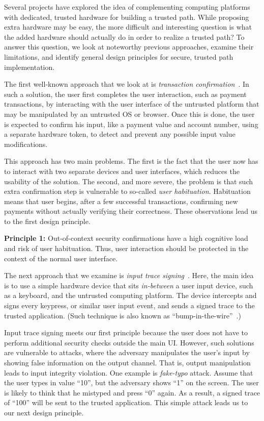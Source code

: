 Several projects have explored the idea of complementing computing platforms with dedicated, trusted hardware for building a trusted path. While proposing extra hardware may be easy, the more difficult and interesting question is what the added hardware should actually do in order to realize a trusted path? To answer this question, we look at noteworthy previous approaches, examine their limitations, and identify general design principles for secure, trusted path implementation.
    
The first well-known approach that we look at is \emph{transaction confirmation}~\cite{filyanov2011uni}. In such a solution, the user first completes the user interaction, such as payment transactions, by interacting with the user interface of the untrusted platform that may be manipulated by an untrusted OS or browser. Once this is done, the user is expected to confirm his input, like a payment value and account number, using a separate hardware token, to detect and prevent any possible input value modifications.

This approach has two main problems. The first is the fact that the user now has to interact with two separate devices and user interfaces, which reduces the usability of the solution. The second, and more severe, the problem is that such extra confirmation step is vulnerable to so-called \emph{user habituation}. Habituation means that user begins, after a few successful transactions, confirming new payments without actually verifying their correctness. These observations lead us to the first design principle.  

\begin{tcolorbox}
\textbf{Principle 1:} Out-of-context security confirmations have a high cognitive load and risk of user habituation. Thus, user interaction should be protected in the context of the normal user interface.
\end{tcolorbox}

The next approach that we examine is \emph{input trace signing}~\cite{IntegriKey}. Here, the main idea is to use a simple hardware device that sits \emph{in-between} a user input device, such as a keyboard, and the untrusted computing platform. The device intercepts and signs every keypress, or similar user input event, and sends a signed trace to the trusted application. (Such technique is also known as ``bump-in-the-wire''~\cite{McCPerRei2006}.) 

Input trace signing meets our first principle because the user does not have to perform additional security checks outside the main UI. However, such solutions are vulnerable to attacks, where the adversary manipulates the user's input by showing false information on the output channel. That is, output manipulation leads to input integrity violation. One example is \emph{fake-typo} attack. Assume that the user types in value ``10'', but the adversary shows ``1'' on the screen. The user is likely to think that he mistyped and press ``0'' again. As a result, a signed trace of ``100'' will be sent to the trusted application. This simple attack leads us to our next design principle.


